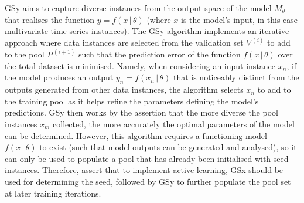 \documentclass[a4paper, 11pt]{report}
\begin{document}
    GSy \citep{wu-2019} aims to capture diverse instances from the output space of the model $M_{\theta}$ that realises the function $y = f( x \, \vert \, \theta )$ (where $x$ is the model's input, in this case multivariate time series instances). The GSy algorithm implements an iterative approach where data instances are selected from the validation set $V^{\,(i)}$ to add to the pool $P^{\,(i+1)}$ such that the prediction error of the function $f( x \, \vert \, \theta )$ over the total dataset is minimised. Namely, when considering an input instance $x_n$, if the model produces an output $y_n = f( x_n \, \vert \, \theta )$ that is noticeably distinct from the outputs generated from other data instances, the algorithm selects $x_n$ to add to the training pool as it helps refine the parameters defining the model's predictions. GSy then works by the assertion that the more diverse the pool instances $x_m$ collected, the more accurately the optimal parameters of the model can be determined. However, this algorithm requires a functioning model $f( x \, \vert \, \theta )$ to exist (such that model outputs can be generated and analysed), so it can only be used to populate a pool that has already been initialised with seed instances. Therefore, \citet{wu-2019} assert that to implement active learning, GSx should be used for determining the seed, followed by GSy to further populate the pool set at later training iterations.
\end{document}

